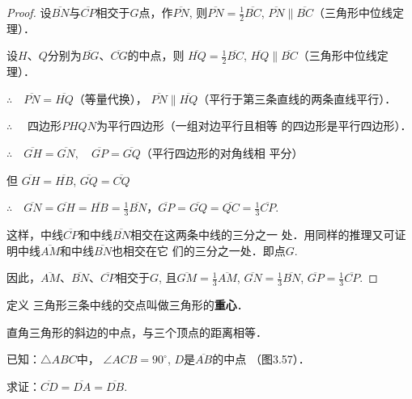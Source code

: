 \begin{proof}
设$\overline{BN}$与$\overline{CP}$相交于$G$点，作$\overline{PN}$, 则$\overline{PN}=\frac{1}{2}\overline{BC}$, 
$\overline{PN}\parallel \overline{BC}$（三角形中位线定理）．

设$H$、$Q$分别为$\overline{BG}$、$\overline{CG}$的中点，则
$\overline{HQ}=\frac{1}{2}\overline{BC}$, $\overline{HQ}\parallel\overline{BC}$（三角形中位线定理）．

$\therefore\quad \overline{PN}=\overline{HQ}$（等量代换），
$\overline{PN}\parallel \overline{HQ}$（平行于第三条直线的两条直线平行）．

$\therefore\quad$ 四边形$PHQN$为平行四边形（一组对边平行且相等
的四边形是平行四边形）．

$\therefore\quad \overline{GH}=\overline{GN},\quad \overline{GP}=\overline{GQ}$（平行四边形的对角线相
平分）

但 $\overline{GH}=\overline{HB}$, $\overline{GQ}=\overline{CQ}$

$\therefore\quad \overline{GN}=\overline{GH}=\overline{HB}=\frac{1}{3}\overline{BN}$，$\overline{GP}=\overline{GQ}=\overline{QC}=\frac{1}{3}\overline{CP}$.

这样，中线$\overline{CP}$和中线$\overline{BN}$相交在这两条中线的三分之一
处．用同样的推理又可证明中线$\overline{AM}$和中线$\overline{BN}$也相交在它
们的三分之一处．即点$G$. 

因此，$\overline{AM}$、$\overline{BN}$、$\overline{CP}$相交于$G$, 且$\overline{GM}=\frac{1}{3}\overline{AM}$, $\overline{GN}=\frac{1}{3}\overline{BN}$, $\overline{GP}=\frac{1}{3}\overline{CP}$.
\end{proof}

\begin{blk}
    {定义} 三角形三条中线的交点叫做三角形的\textbf{重心}．
\end{blk}

\begin{example}
    直角三角形的斜边的中点，与三个顶点的距离相等．
\end{example}
    
已知：$\triangle ABC$中，
$\angle ACB=90^{\circ}$, 
$D$是$\overline{AB}$的中点
（图3.57）．

求证：$\overline{CD}=\overline{DA}=\overline{DB}$.

